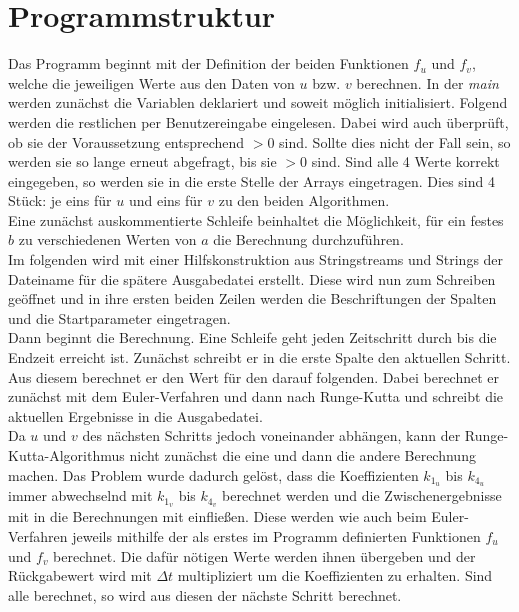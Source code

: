 \documentclass[12pt,a4paper,titlepage,headinclude,bibtotoc]{scrartcl}
\begin{document}
\section{Programmstruktur}
Das Programm beginnt mit der Definition der beiden Funktionen $f_u$ und $f_v$, welche die jeweiligen Werte aus den Daten von $u$ bzw. $v$ berechnen.
In der \emph{main} werden zunächst die Variablen deklariert und soweit möglich initialisiert.
Folgend werden die restlichen per Benutzereingabe eingelesen.
Dabei wird auch überprüft, ob sie der Voraussetzung entsprechend $>0$ sind.
Sollte dies nicht der Fall sein, so werden sie so lange erneut abgefragt, bis sie $>0$ sind.
Sind alle 4 Werte korrekt eingegeben, so werden sie in die erste Stelle der Arrays eingetragen.
Dies sind 4 Stück: je eins für $u$ und eins für $v$ zu den beiden Algorithmen.\\
Eine zunächst auskommentierte Schleife beinhaltet die Möglichkeit, für ein festes $b$ zu verschiedenen Werten von $a$ die Berechnung  durchzuführen.\\
Im folgenden wird mit einer Hilfskonstruktion aus Stringstreams und Strings der Dateiname für die spätere Ausgabedatei erstellt.
Diese wird nun zum Schreiben geöffnet und in ihre ersten beiden Zeilen werden die Beschriftungen der Spalten und die Startparameter eingetragen.\\
Dann beginnt die Berechnung. Eine Schleife geht jeden Zeitschritt durch bis die Endzeit erreicht ist.
Zunächst schreibt er in die erste Spalte den aktuellen Schritt.
Aus diesem berechnet er den Wert für den darauf folgenden.
Dabei berechnet er zunächst mit dem Euler-Verfahren und dann nach Runge-Kutta und schreibt die aktuellen Ergebnisse in die Ausgabedatei.\\
Da $u$ und $v$ des nächsten Schritts jedoch voneinander abhängen, kann der Runge-Kutta-Algorithmus nicht zunächst die eine und dann die andere Berechnung machen.
Das Problem wurde dadurch gelöst, dass die Koeffizienten $k_{1_u}$ bis $k_{4_u}$ immer abwechselnd mit $k_{1_v}$ bis $k_{4_v}$ berechnet werden und die Zwischenergebnisse mit in die Berechnungen mit einfließen.
Diese werden wie auch beim Euler-Verfahren jeweils mithilfe der als erstes im Programm definierten Funktionen $f_u$ und $f_v$ berechnet.
Die dafür nötigen Werte werden ihnen übergeben und der Rückgabewert wird mit $\Delta t$ multipliziert um die Koeffizienten zu erhalten.
Sind alle berechnet, so wird aus diesen der nächste Schritt berechnet.
\end{document}
